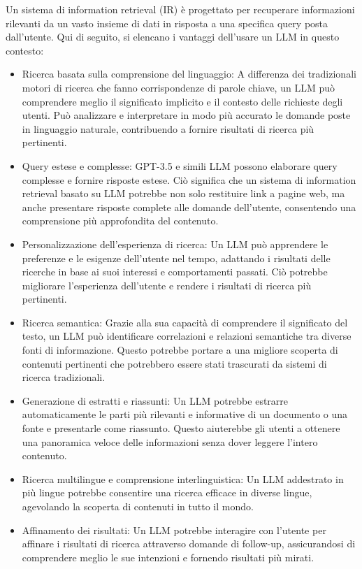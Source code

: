 Un sistema di information retrieval (IR) è progettato per recuperare informazioni rilevanti da un vasto insieme di dati in risposta a una specifica query posta dall'utente. 
Qui di seguito, si elencano i vantaggi dell'usare un LLM in questo contesto:
\begin{itemize}
    \item Ricerca basata sulla comprensione del linguaggio: 
    A differenza dei tradizionali motori di ricerca che fanno corrispondenze di parole chiave,
     un LLM può comprendere meglio il significato implicito e il contesto delle richieste degli utenti.
      Può analizzare e interpretare in modo più accurato le domande poste in linguaggio naturale, 
      contribuendo a fornire risultati di ricerca più pertinenti.
    \item Query estese e complesse: GPT-3.5 e simili LLM possono elaborare query complesse e fornire risposte estese. Ciò significa che un sistema di information retrieval basato su LLM potrebbe non solo restituire link a pagine web, ma anche presentare risposte complete alle domande dell'utente, consentendo una comprensione più approfondita del contenuto.
    \item 
    Personalizzazione dell'esperienza di ricerca: Un LLM può apprendere le preferenze e le esigenze dell'utente nel tempo, adattando i risultati delle ricerche in base ai suoi interessi e comportamenti passati. Ciò potrebbe migliorare l'esperienza dell'utente e rendere i risultati di ricerca più pertinenti.
    \item Ricerca semantica: Grazie alla sua capacità di comprendere il significato del testo, un LLM può identificare correlazioni e relazioni semantiche tra diverse fonti di informazione. Questo potrebbe portare a una migliore scoperta di contenuti pertinenti che potrebbero essere stati trascurati da sistemi di ricerca tradizionali.
    \item 
    Generazione di estratti e riassunti: Un LLM potrebbe estrarre automaticamente le parti più rilevanti e informative di un documento o una fonte e presentarle come riassunto. Questo aiuterebbe gli utenti a ottenere una panoramica veloce delle informazioni senza dover leggere l'intero contenuto.

    \item Ricerca multilingue e comprensione interlinguistica: Un LLM addestrato in più lingue potrebbe consentire una ricerca efficace in diverse lingue, agevolando la scoperta di contenuti in tutto il mondo.

    \item 
    Affinamento dei risultati: Un LLM potrebbe interagire con l'utente per affinare i risultati di ricerca attraverso domande di follow-up, assicurandosi di comprendere meglio le sue intenzioni e fornendo risultati più mirati.
    
\end{itemize}